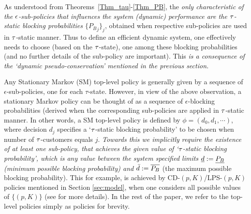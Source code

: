 As understood from Theorems~\ref{Thm_tau}-\ref{Thm_PB}, the {\it only
  characteristic of the ${ \epsilon }$-sub-policies that influences the system
  (dynamic) performance are the ${\tau}$-static blocking probabilities $\{
  {P_B}_j\}_j$}, obtained when respective sub-policies are used in
${\tau}$-static manner. Thus to define an efficient dynamic system, one
effectively needs to choose (based on the ${\tau}$-state), one among these
blocking probabilities (and no further details of the sub-policy are
important).  This {\it is a consequence of the `dynamic
  pseudo-conservation' mentioned in the previous section.}

Any Stationary Markov (SM) top-level policy is generally given by a
sequence of $\epsilon$-sub-policies, one for each
$\tau$-state. However, in view of the above observation, a stationary
Markov policy can be thought of as a sequence of $\epsilon$-blocking
probabilities (derived when the corresponding sub-policies are applied
in ${\tau}$-static manner.  In other words, a SM top-level policy is
defined by $\phi = (d_0, d_1, \cdots )$, where decision $d_j$
specifies a `${\tau}$-static blocking probability' to be chosen when
number of ${\tau}$-customers equals $j$.  {\it Towards this we implicitly
  require the existence of at least one sub-policy, that achieves the
  given value of `${\tau}$-static blocking probability', which is any
  value between the system specified limits ${\underline d}:={\underline
    {P_B}}$ (minimum possible blocking probability) and ${\bar d} :=
  {\overline {P_B}}$} (the maximum possible blocking probability).
This for example, is achieved by CD-$(p, K)$/LPS-$(p,K)$ policies
mentioned in Section \ref{sec:model}, when one considers all possible
values of $\{(p, K)\}$ (see \cite{Value, ANOR} for more details). In
the rest of the paper, we refer to the top-level policies simply as
policies for brevity.\\



